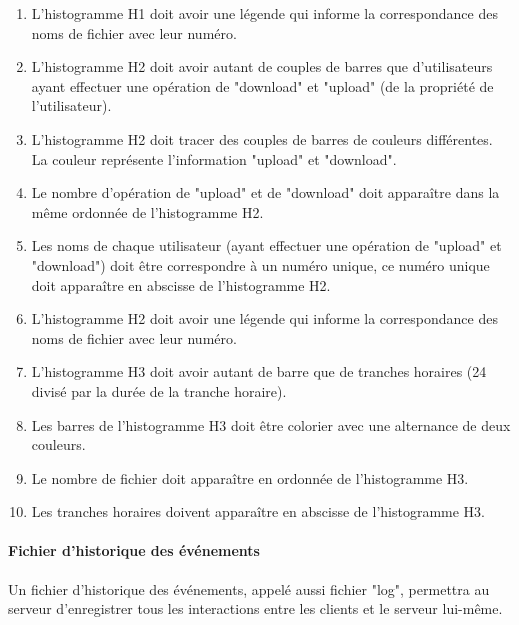 \documentclass[10pt,a4paper]{report}
\begin{document}
\begin{enumerate}
			\item L'histogramme H1 doit avoir une légende qui informe la correspondance des noms de fichier avec leur numéro.
			\item L'histogramme H2 doit avoir autant de couples de barres que d'utilisateurs ayant effectuer une opération de "download" et "upload" (de la propriété de l'utilisateur).
			\item L'histogramme H2 doit tracer des couples de barres de couleurs différentes. La couleur représente l'information "upload" et "download".
			\item Le nombre d'opération de "upload" et de "download" doit apparaître dans la même ordonnée de l'histogramme H2.

			\item Les noms de chaque utilisateur (ayant effectuer une opération de "upload" et "download") doit être correspondre à un numéro unique, ce numéro unique doit apparaître en abscisse de l'histogramme H2.
			\item L'histogramme H2 doit avoir une légende qui informe la correspondance des noms de fichier avec leur numéro.
			\item L'histogramme H3 doit avoir autant de barre que de tranches horaires (24 divisé par la durée de la tranche horaire).
			\item Les barres de l'histogramme H3 doit être colorier avec une alternance de deux couleurs.
			\item Le nombre de fichier doit apparaître en ordonnée de l'histogramme H3.
			\item Les tranches horaires doivent apparaître en abscisse de l'histogramme H3.

		\end{enumerate}
		
\paragraph{Fichier d'historique des événements}

Un fichier d'historique des événements, appelé aussi fichier "log", permettra au serveur d'enregistrer tous les interactions entre les clients et le serveur lui-même.
\end{document}
